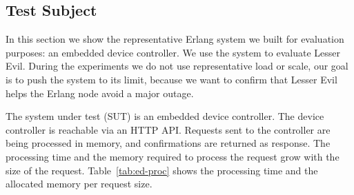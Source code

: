 \documentclass{llncs}
\begin{document}
%
%


\subsection{Test Subject}
In this section we show the representative Erlang system we built for evaluation purposes: an embedded device controller. We use the system to evaluate Lesser Evil. During the experiments we do not use representative load or scale, our goal is to push the system to its limit, because we want to confirm that Lesser Evil helps the Erlang node avoid a major outage. 

The system under test (SUT) is an embedded device controller. The device controller is reachable via an HTTP API. Requests sent to the controller are being processed in memory, and confirmations are returned as response. The processing time and the memory required to process the request grow with the size of the request. Table~\ref{tab:ed-proc} shows the processing time and the allocated memory per request size.
\end{document}
